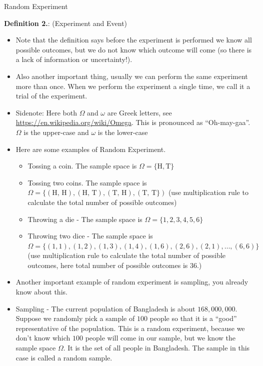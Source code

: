 \documentclass[8pt, usepdftitle = false]{beamer}
\newcounter{mytheorem}
\renewcommand{\themytheorem}{2.\arabic{mytheorem}}
\newcommand{\Thm}[1]{\refstepcounter{mytheorem}\textbf{#1\color{blue}\themytheorem}:}
\begin{document}
\begin{frame}[allowframebreaks]{Random Experiment}
\begin{varblock}{\Thm{Definition \label{d1.1}} (Experiment and Event)}
\end{varblock}


\begin{itemize}


\framebreak

\item Note that the definition says before the experiment is performed we know all possible outcomes, but we do not know which outcome will come (so there is a lack of information or uncertainty!). 

\item Also another important thing, usually we can perform the same experiment more than once. When we perform the experiment a single time, we call it a \alert{trial} of the experiment. 


\item Sidenote: Here both $\Omega$ and $\omega$ are Greek letters, see \url{https://en.wikipedia.org/wiki/Omega}. This is pronounced as ``Oh-may-gaa''. $\Omega$ is the upper-case and $\omega$ is the lower-case

\framebreak

\item Here are some examples of Random Experiment.

\begin{itemize}
\item Tossing a coin. The sample space is $\Omega = \{\textrm{H}, \textrm{T}\}$
\item Tossing two coins.  The sample space is  $\Omega = \{(\textrm{H, H}), (\textrm{H, T}), (\textrm{T, H}), (\textrm{T, T}\})$ (use multiplication rule to calculate the total number of possible outcomes)
\item Throwing a die -  The sample space is  $\Omega  = \{1, 2, 3, 4, 5, 6\}$
\item Throwing two dice -  The sample space is  $\Omega  = \{(1,1), (1,2), (1,3), (1,4), (1,6), (2, 6), (2, 1), \ldots, (6, 6)\}$ (use multiplication rule to calculate the total number of possible outcomes, here total number of possible outcomes is $36$.)

\end{itemize}

\framebreak

\item Another important example of random experiment is sampling, you already know about this.


\item Sampling - The current population of Bangladesh is about $168,000,000$. Suppose we \alert{randomly pick a sample} of $100$ people so that it is a ``good'' representative of the population. This is a random experiment, because we don't know which $100$ people will come in our sample, but we know the sample space $\Omega$. It is the set of all people in Bangladesh. The sample in this case is called a \alert{random sample}. 


\end{itemize}
\end{frame}
\end{document}
